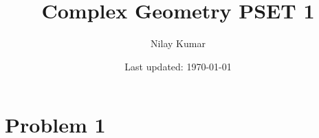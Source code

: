 \documentclass{../../mathnotes}
\title{Complex Geometry PSET 1}
\author{Nilay Kumar}
\date{Last updated: \today}
\begin{document}
\maketitle

\section*{Problem 1}
\end{document}
